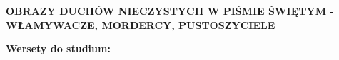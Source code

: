 \documentclass[10pt,a4paper,oneside]{article}
\begin{document}
\centerline{\textbf{\MakeUppercase{Obrazy duchów nieczystych w Piśmie Świętym - włamywacze, mordercy, pustoszyciele}}}
\begin{center}
\textbf{Wersety do studium:} 

\end{center}
\end{document}
